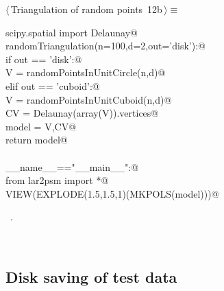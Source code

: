 \documentclass[11pt,oneside]{article}	%
\begin{document}
\begin{flushleft} \small
\begin{minipage}{\linewidth} \label{scrap19}
\protect{}$\langle\,$Triangulation of random points\nobreak\ {\footnotesize 12b}$\,\rangle\equiv$
\vspace{-1ex}
\begin{list}{}{} \item
\mbox{}\verb@from scipy.spatial import Delaunay@\\
\mbox{}\verb@def randomTriangulation(n=100,d=2,out='disk'):@\\
\mbox{}\verb@   if out == 'disk':@\\
\mbox{}\verb@      V = randomPointsInUnitCircle(n,d)@\\
\mbox{}\verb@   elif out == 'cuboid':@\\
\mbox{}\verb@      V = randomPointsInUnitCuboid(n,d)@\\
\mbox{}\verb@   CV = Delaunay(array(V)).vertices@\\
\mbox{}\verb@   model = V,CV@\\
\mbox{}\verb@   return model@\\
\mbox{}\verb@@\\
\mbox{}\verb@if __name__=="__main__":@\\
\mbox{}\verb@   from lar2psm import *@\\
\mbox{}\verb@   VIEW(EXPLODE(1.5,1.5,1)(MKPOLS(model)))@\\
\mbox{}\verb@@{\NWsep}
\end{list}
\vspace{-1ex}
\footnotesize\addtolength{\baselineskip}{-1ex}
\begin{list}{}{\setlength{\itemsep}{-\parsep}\setlength{\itemindent}{-\leftmargin}}
\item \NWtxtMacroRefIn\ .
\end{list}
\end{minipage}\\[4ex]
\end{flushleft}

\subsection{Disk saving of test data}
\end{document}
